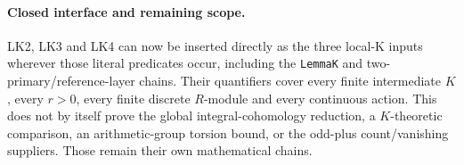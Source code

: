 \paragraph{Closed interface and remaining scope.}
LK2, LK3 and LK4 can now be inserted directly as the three local-K
inputs wherever those literal predicates occur, including the
\texttt{LemmaK} and two-primary/reference-layer chains.  Their
quantifiers cover every finite intermediate $K$, every $r>0$, every
finite discrete $R$-module and every continuous action.  This does
not by itself prove the global integral-cohomology reduction, a
$K$-theoretic comparison, an arithmetic-group torsion bound, or the
odd-plus count/vanishing suppliers.  Those remain their own
mathematical chains.
